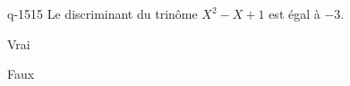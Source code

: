 \begin{truefalse}{q-1515}
Le discriminant du trinôme $X^2-X+1$ est égal à $-3$.
\item* Vrai
\item Faux
\end{truefalse}

